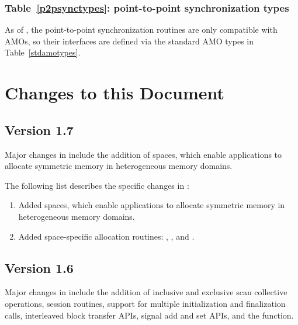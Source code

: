 \subsection{Table~\ref{p2psynctypes}: point-to-point synchronization types}
\label{dep:p2p_sync_types}
As of , the point-to-point synchronization routines are only
compatible with \acp{AMO}, so their interfaces are defined via the
standard \ac{AMO} types in Table~\ref{stdamotypes}.




\chapter{Changes to this Document}\label{sec:changelog}

\section{Version 1.7}
\label{changelog:v1.7}

Major changes in \openshmem[1.7] include the addition of spaces, which enable
applications to allocate symmetric memory in heterogeneous memory domains.

The following list describes the specific changes in \openshmem[1.7]:
\begin{enumerate}
%
\item Added spaces, which enable applications to allocate symmetric memory in
    heterogeneous memory domains. %
%
\item Added space-specific allocation routines: ,
    , and .
%
%
\end{enumerate}

\section{Version 1.6}
\label{changelog:v1.6}
Major changes in \openshmem[1.6] include the addition of inclusive and
exclusive scan collective operations, session routines, support for multiple
initialization and finalization calls, interleaved block transfer APIs,
signal add and set APIs, and the
 function.

